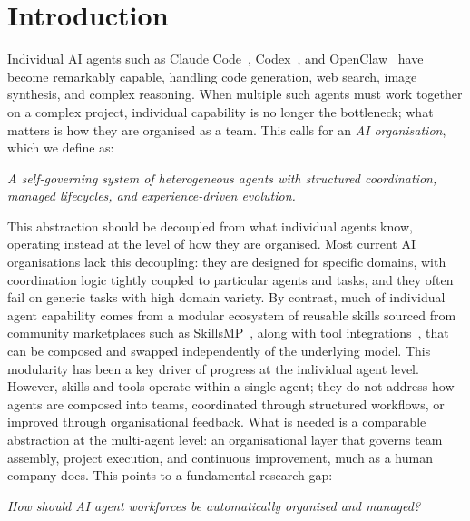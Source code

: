 \documentclass[11pt,a4paper]{article}
\begin{document}
\clearpage

\section{Introduction}
\label{sec:introduction}

Individual AI agents such as Claude Code~\cite{anthropic2024claudecode}, Codex~\cite{openai2024codex}, and OpenClaw~\cite{openclaw2024} have become remarkably capable, handling code generation, web search, image synthesis, and complex reasoning.  When multiple such agents must work together on a complex project, individual capability is no longer the bottleneck; what matters is how they are organised as a team.  This calls for an \emph{AI organisation}, which we define as:
\begin{center}
\textit{A self-governing system of heterogeneous agents with structured coordination, managed lifecycles, and experience-driven evolution.}
\end{center}  This abstraction should be decoupled from what individual agents know, operating instead at the level of how they are organised.  Most current AI organisations lack this decoupling: they are designed for specific domains, with coordination logic tightly coupled to particular agents and tasks, and they often fail on generic tasks with high domain variety.  By contrast, much of individual agent capability comes from a modular ecosystem of reusable skills sourced from community marketplaces such as SkillsMP~\cite{skillsmp}, along with tool integrations~\cite{mcpzoo2025}, that can be composed and swapped independently of the underlying model.  This modularity has been a key driver of progress at the individual agent level.  However, skills and tools operate within a single agent; they do not address how agents are composed into teams, coordinated through structured workflows, or improved through organisational feedback.  What is needed is a comparable abstraction at the multi-agent level: an organisational layer that governs team assembly, project execution, and continuous improvement, much as a human company does.  This points to a fundamental research gap:
\begin{center}
\textit{How should AI agent workforces be automatically organised and managed?}
\end{center}
\end{document}
